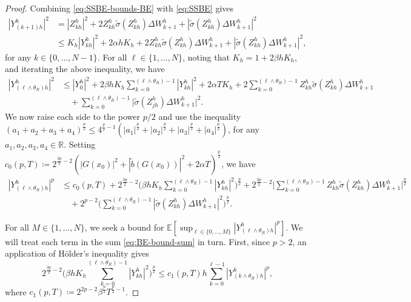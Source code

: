 \documentclass[onseside, final]{amsart}
\theoremstyle{definition}
\newcommand{\R}{\mathbb R}
\newcommand{\E}{\mathbb E}
\numberwithin{equation}{section}
\begin{document}
\begin{proof}
			Combining \eqref{eq:SSBE-bounds-BE} with \eqref{eq:SSBE} gives
			\begin{equation}
				\begin{split}
					|Y^h_{(k + 1)h}|^2 & = |Z^h_{kh}|^2 + 2 Z^h_{kh} \tilde \sigma(Z^h_{kh}) \Delta W^h_{k + 1} + |\tilde \sigma(Z^h_{kh}) \Delta W^h_{k+1}|^2\\
					& \leq K_h |Y^h_{kh}|^2 + 2 \alpha h K_h + 2 Z^h_{kh} \tilde \sigma(Z^h_{kh}) \Delta W^h_{k + 1} + |\tilde \sigma(Z^h_{kh}) \Delta W^h_{k+1}|^2,
				\end{split}
			\end{equation}
			for any $k \in \{0, \dotsc, N - 1\}$.
			For all $\ell \in \{1, \dotsc, N\}$, noting that $K_h = 1 + 2\beta h K_h$, and iterating the above inequality, we have
			\begin{equation}
				\begin{split}
					|Y^h_{(\ell \wedge \theta_R)h}|^2 & \leq |Y^h_0|^2 + 2 \beta h K_h \sum_{k = 0}^{(\ell \wedge \theta_R) - 1}|Y^h_{kh}|^2 + 2 \alpha TK_h + 2 \sum_{k = 0}^{(\ell \wedge \theta_R) - 1}Z^h_{kh} \tilde \sigma(Z^h_{kh}) \Delta W^h_{k + 1}\\
					& \quad + \sum_{k = 0}^{(\ell \wedge \theta_R) - 1}\bigl|\tilde \sigma(Z^h_{jh})\Delta W^h_{k + 1}\bigr|^2.
				\end{split}
			\end{equation}
			We now raise each side to the power $p/2$ and use the inequality $(a_1 + a_2 + a_3 + a_4)^{\frac p2} \leq 4^{\frac p2 - 1}(|a_1|^{\frac p2} + |a_2|^{\frac p2} + |a_3|^{\frac p2} + |a_4|^{\frac p2})$, for any $a_1, a_2, a_3, a_4 \in \R$. Setting $c_0(p, T) \coloneqq 2^{\frac {3p}{2} - 2}(|G(x_0)|^2 + |\tilde b(G(x_0))|^2 + 2 \alpha T)^{\frac p2}$, we have
			\begin{equation}\label{eq:BE-bound-sum}
				\begin{split}
					|Y^h_{(\ell \wedge \theta_R)h}|^p & \leq c_0(p, T) + 2^{\frac{3p}{2} - 2}\bigg(\beta h K_h \sum_{k = 0}^{(\ell \wedge \theta_R) - 1}|Y^h_{kh}|^2\bigg)^{\frac p2} + 2^{\frac{3p}{2} - 2}\bigg | \sum_{k = 0}^{(\ell \wedge \theta_R) - 1} Z^h_{kh} \tilde \sigma(Z^h_{kh}) \Delta W^h_{k + 1}\bigg |^{\frac p2}\\
					& \quad + 2^{p - 2}\bigg(\sum_{k = 0}^{(\ell \wedge \theta_R) - 1}|\tilde \sigma(Z^h_{kh}) \Delta W^h_{k + 1}|^2\bigg)^{\frac p2}.
				\end{split}
			\end{equation}
			
			For all $M \in \{1, \dotsc, N\}$, we seek a bound for $\E[\sup_{\ell \in \{0, \dotsc, M\}} |Y^h_{(\ell \wedge \theta_R)h}|^p]$. We will treat each term in the sum \eqref{eq:BE-bound-sum} in turn. First, since $p > 2$, an application of H\"older's inequality gives
			\begin{equation}\label{eq:BE-bound-1}
				2^{\frac{3p}{2} - 2}\bigg(\beta h K_h \sum_{k = 0}^{(\ell \wedge \theta_R) - 1}|Y^h_{kh}|^2\bigg)^{\frac p2} \leq c_1(p, T) h \sum_{k = 0}^{\ell - 1} |Y^h_{(k \wedge \theta_R)h}|^p,
			\end{equation}
			where $c_1(p, T) \coloneqq 2^{2p - 2}\beta^{\frac p2} T^{\frac p2 -1}$.
			

\end{proof}
\end{document}
